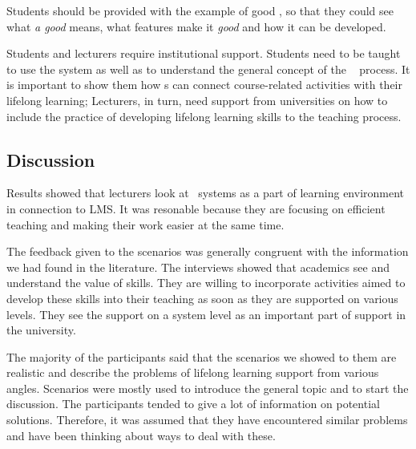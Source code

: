 
Students should be provided with the example of good \ep, so that they
could see what \textit{a good \ep} means, what features make it
\textit{good} and how it can be developed.


Students and lecturers require institutional support. Students need to be taught
to use the system as well as to understand the general concept of the \ep~
process. It is important to show them how \ep s can connect course-related
activities with their lifelong learning; Lecturers, in turn, need support from
universities on how to include the practice of developing lifelong learning
skills to the teaching process.

 
\subsection{Discussion}
Results showed that lecturers look at \ep~systems as a part of learning
environment in connection to LMS. It was resonable because they are focusing on
efficient teaching and making their work easier at the same time.

The feedback given to the scenarios was generally congruent with the information
we had found in the literature. The interviews showed that academics see and
understand the value of \LLLs skills. They are willing to incorporate activities
aimed to develop these skills into their teaching as soon as they are supported
on various levels. They see the support on a system level as an important part
of \LLLs support in the university.

The majority of the participants said that the scenarios we showed to them are
realistic and describe the problems of lifelong learning support from various
angles. Scenarios were mostly used to introduce the general topic and to start
the discussion. The participants tended to give a lot of information on
potential solutions. Therefore, it was assumed that they have encountered
similar problems and have been thinking about ways to deal with these.

